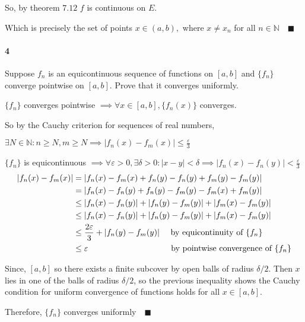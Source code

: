 \documentclass{article}
\newcommand\N{\mathbb{N}}
\begin{document}
So, by theorem $7.12$ $f$ is
continuous on $E$.

Which is precisely the set of points $x \in (a,b),$
where $x \neq x_n$ for all $n\in \N \quad \blacksquare$

\paragraph{4} Suppose ${f_n}$ is an equicontinuous sequence of
functions on $[a, b]$ and $\{f_n\}$ converge pointwise on $[a,
b]$. Prove that it converges uniformly.



$\{f_n\}$ converges pointwise $\implies \forall x\in [a,b],
\{f_n(x)\}$ converges.

So by the Cauchy criterion for sequences of real numbers,

$\exists N\in \N: n\geq N, m\geq N \implies |f_n(x)-f_m(x)|\leq \frac{\varepsilon}{3}$

$\{f_n\}$ is equicontinuous $\implies \forall \varepsilon > 0, \exists
\delta >0: |x-y|<\delta \implies
|f_n(x)-f_n(y)|<\frac{\varepsilon}{3}$
\begin{align*}
  |f_n(x)-f_m(x)| &= |f_n(x)-f_m(x) +f_n(y)-f_n(y) +f_m(y)-f_m(y)| \\
                  &= |f_n(x)-f_n(y) +f_n(y)-f_m(y) -f_m(x) +f_m(y)| \\
                  &\leq |f_n(x)-f_n(y)|+|f_n(y)-f_m(y)|+|f_m(x)
                    -f_m(y)|\\
                  &\leq |f_n(x)-f_n(y)|+|f_n(y)-f_m(y)|+|f_m(x)
                    -f_m(y)|\\
                  &\leq \frac{2\varepsilon}{3} + |f_n(y)-f_m(y)|
                    \quad \text{ by equicontinuity of $\{f_n\}$}\\
                  &\leq \varepsilon
                    \hspace{3.4cm} \text{ by pointwise convergence of $\{f_n\}$}
\end{align*}

Since, $[a,b]$ so there exists a finite subcover by open balls of
radius $\delta/2$. Then $x$ lies in one of the
balls of radius $\delta/2$, so the previous inequality shows the Cauchy condition for uniform
convergence of functions holds for all $x\in [a,b]$.

Therefore, $\{f_n\}$ converges uniformly$\quad \blacksquare$
\end{document}
